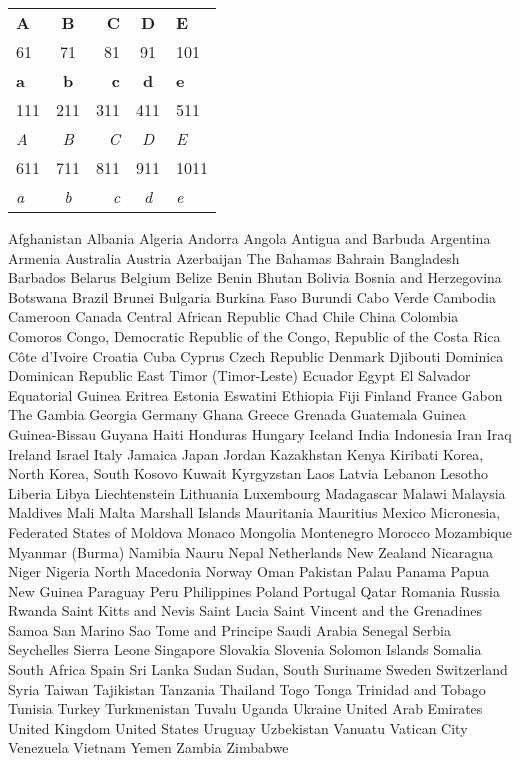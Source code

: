 \begin{table}
\begin{tabular}{lcrcl}
\textbf{A} & \textbf{B}& \textbf{C}       & \textbf{D} & \textbf{E}  \\
61         & 71        & 81               & 91         & 101         \\
\textbf{a} & \textbf{b}& \textbf{c}       & \textbf{d} & \textbf{e} \\
111        & 211       & 311              & 411        & 511         \\
\textit{A} & \textit{B}& \textit{C}       & \textit{D} & \textit{E}  \\
611        & 711       & 811              & 911        & 1011        \\
\textit{a} & \textit{b}& \textit{c}       & \textit{d} & \textit{e}  \\ \hline
\end{tabular}
\end{table}



Afghanistan Albania Algeria Andorra Angola Antigua and Barbuda Argentina Armenia Australia Austria Azerbaijan The Bahamas Bahrain Bangladesh Barbados Belarus Belgium Belize Benin Bhutan Bolivia Bosnia and Herzegovina Botswana Brazil Brunei Bulgaria Burkina Faso Burundi Cabo Verde Cambodia Cameroon Canada Central African Republic Chad Chile China Colombia Comoros Congo, Democratic Republic of the Congo, Republic of the Costa Rica Côte d’Ivoire Croatia Cuba Cyprus Czech Republic Denmark Djibouti Dominica Dominican Republic East Timor (Timor-Leste) Ecuador Egypt El Salvador Equatorial Guinea Eritrea Estonia Eswatini Ethiopia Fiji Finland France Gabon The Gambia Georgia Germany Ghana Greece Grenada Guatemala Guinea Guinea-Bissau Guyana Haiti Honduras Hungary Iceland India Indonesia Iran Iraq Ireland Israel Italy Jamaica Japan Jordan Kazakhstan Kenya Kiribati Korea, North Korea, South Kosovo Kuwait Kyrgyzstan Laos Latvia Lebanon Lesotho Liberia Libya Liechtenstein Lithuania Luxembourg Madagascar Malawi Malaysia Maldives Mali Malta Marshall Islands Mauritania Mauritius Mexico Micronesia, Federated States of Moldova Monaco Mongolia Montenegro Morocco Mozambique Myanmar (Burma) Namibia Nauru Nepal Netherlands New Zealand Nicaragua Niger Nigeria North Macedonia Norway Oman Pakistan Palau Panama Papua New Guinea Paraguay Peru Philippines Poland Portugal Qatar Romania Russia Rwanda Saint Kitts and Nevis Saint Lucia Saint Vincent and the Grenadines Samoa San Marino Sao Tome and Principe Saudi Arabia Senegal Serbia Seychelles Sierra Leone Singapore Slovakia Slovenia Solomon Islands Somalia South Africa Spain Sri Lanka Sudan Sudan, South Suriname Sweden Switzerland Syria Taiwan Tajikistan Tanzania Thailand Togo Tonga Trinidad and Tobago Tunisia Turkey Turkmenistan Tuvalu Uganda Ukraine United Arab Emirates United Kingdom United States Uruguay Uzbekistan Vanuatu Vatican City Venezuela Vietnam Yemen Zambia Zimbabwe

